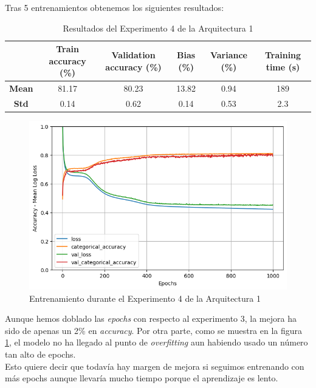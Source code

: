 \documentclass{article}
\begin{document}
			Tras 5 entrenamientos obtenemos los siguientes resultados:
			\begin{table}[!h]
				\begin{center}
					\begin{tabular}{ c | c | c | c | c | c |}
						\ & \textbf{Train accuracy (\%)} & \textbf{Validation accuracy (\%)} & \textbf{Bias (\%)} & \textbf{Variance (\%)} & \textbf{Training time (s)} \\ \hline
						\textbf{Mean} & 81.17 & 80.23 & 13.82 & 0.94 & 189\\ \hline
						\textbf{Std} & 0.14 & 0.62 & 0.14 & 0.53 & 2.3 \\ \hline
					\end{tabular}
					\caption{Resultados del Experimento 4 de la Arquitectura 1}
					\label{tab:res-d-a1-e4}
				\end{center}
			\end{table}
			
			\begin{figure}[!h]
				\begin{center}
					\includegraphics[scale=0.5]{d-tr-a1-e4.png}		
					\caption{Entrenamiento durante el Experimento 4 de la Arquitectura 1}	
					\label{d-tr-a1-e4}
				\end{center}
			\end{figure}
			
			Aunque hemos doblado las \textit{epochs} con respecto al experimento 3, la mejora ha sido de apenas un 2\% en \textit{accuracy}. Por otra parte, como se muestra en la figura \ref{d-tr-a1-e4}, el modelo no ha llegado al punto de \textit{overfitting} aun habiendo usado un n\'umero tan alto de epochs.\\
			Esto quiere decir que todav\'ia hay margen de mejora si seguimos entrenando con m\'as epochs aunque llevar\'ia mucho tiempo porque el aprendizaje es lento.\\
			
\end{document}
